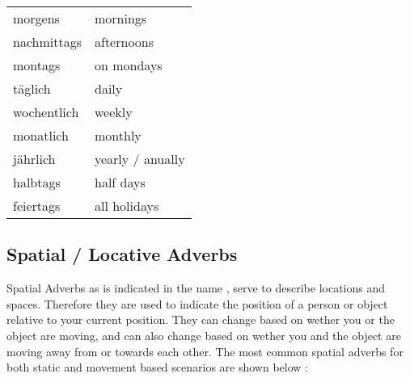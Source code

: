 \documentclass[a4paper,twocolumn,10pt]{article}
\newcommand{\subsectionend}
{
\nolinenumbers
\linenumbers
}
\newcommand{\tabularxtable}[3]
{

	\vspace{0.5cm}
	\nolinenumbers

	\begin{tabularx}{#1}{#2}
		#3
	\end{tabularx}

	\linenumbers
	\vspace{0.5cm}
}
\begin{document}
\tabularxtable
{ 0.95\linewidth  }
{lX}
{
\rowcolor{white}      morgens     & mornings \\
\rowcolor{lightgray}  nachmittags & afternoons  \\
\rowcolor{white}      montags     & on mondays \\
\rowcolor{lightgray}  täglich     & daily \\
\rowcolor{white}      wochentlich & weekly \\
\rowcolor{lightgray}  monatlich   & monthly \\
\rowcolor{white}      jährlich    & yearly / anually \\
\rowcolor{lightgray}  halbtags    & half days \\
\rowcolor{white}      feiertags   & all holidays  \\


}




\subsectionend

\subsection{Spatial / Locative Adverbs}
\label{ssec:spatial_locative_adverbs}

Spatial Adverbs as is indicated in the name , serve to describe locations and
spaces. Therefore they are used to indicate the position of a person or object
relative to your current position. They can change based on wether you or the
object are moving, and can also change based on wether you and the object are
moving away from or towards each other. The most common spatial adverbs for both
static and movement based scenarios are shown below :



\end{document}

